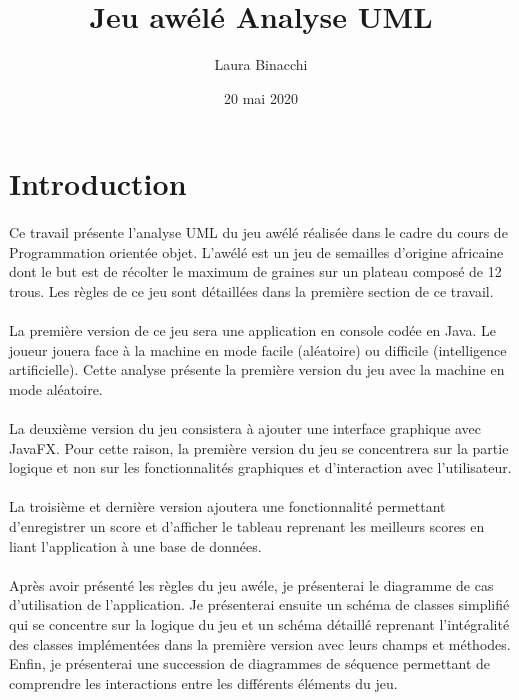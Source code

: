 \documentclass{article}
\title{Jeu awélé\bigbreak \bigbreak
    \large Analyse UML}
\date{20 mai 2020}
\author{Laura Binacchi}
\begin{document}
    
    \newpage
    \tableofcontents
    \newpage

    \section*{Introduction}
    \label{sec:intro}

    \paragraph{}
    Ce travail présente l'analyse UML du jeu awélé réalisée dans le cadre du cours de Programmation orientée objet. L'awélé est un jeu de semailles d'origine africaine dont le but est de récolter le maximum de graines sur un plateau composé de 12 trous. Les règles de ce jeu sont détaillées dans la première section de ce travail.

    \paragraph{}
    La première version de ce jeu sera une application en console codée en Java. Le joueur jouera face à la machine en mode facile (aléatoire) ou difficile (intelligence artificielle). Cette analyse présente la première version du jeu avec la machine en mode aléatoire.

    \paragraph{}
    La deuxième version du jeu consistera à ajouter une interface graphique avec JavaFX. Pour cette raison, la première version du jeu se concentrera sur la partie logique et non sur les fonctionnalités graphiques et d'interaction avec l'utilisateur.  

    \paragraph{}
    La troisième et dernière version ajoutera une fonctionnalité permettant d'enregistrer un score et d'afficher le tableau reprenant les meilleurs scores en liant l'application à une base de données.
    
    \paragraph{}
    Après avoir présenté les règles du jeu awéle, je présenterai le diagramme de cas d'utilisation de l'application. Je présenterai ensuite un schéma de classes simplifié qui se concentre sur la logique du jeu et un schéma détaillé reprenant l'intégralité des classes implémentées dans la première version avec leurs champs et méthodes. Enfin, je présenterai une succession de diagrammes de séquence permettant de comprendre les interactions entre les différents éléments du jeu.
\end{document}

